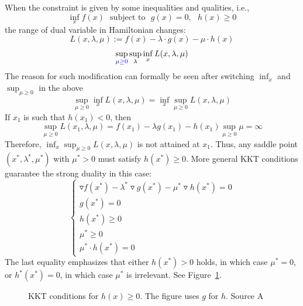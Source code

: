 \documentclass[11pt]{book}
\begin{document}
When the constraint is given by some inequalities and qualities, i.e.,
\begin{equation}
    \label{constraint_optimization2}
    \inf_x f(x) ~~~ \textrm{subject to}~~~g(x)=0,~~~h(x)\ge 0
\end{equation}
the range of dual variable in Hamiltonian changes:
\begin{equation}\label{lagrangian2}
    L(x,\lambda,\mu):= f(x) - \lambda \cdot g(x) - \mu \cdot h(x)
\end{equation}
\begin{equation}
    \sup_{{\color{blue}\mu\ge0}}\sup_{\lambda}\inf_{x}L(x,\lambda,\mu)
\end{equation}
The reason for such modification can formally be seen after switching $\inf_x$ and $\sup_{\mu\ge0}$ in the above
\begin{equation}
    \sup_{\mu\ge0}\inf_{x}L(x,\lambda,\mu) =\inf_{x}\sup_{\mu\ge0}L(x,\lambda,\mu)
\end{equation}
If $x_1$ is such that $h(x_1)<0$, then 
$$\sup_{\mu\ge0}L(x_1,\lambda,\mu)= f(x_1) - \lambda g(x_1) - h(x_1) \sup_{\mu\ge0} \mu =\infty$$
Therefore, $\inf_{x}\sup_{\mu\ge0}L(x,\lambda,\mu)$ is not attained at $x_1$. Thus, any saddle point $(x^*,\lambda^*,\mu^*)$ with $\mu^*>0$ must satisfy $h(x^*)\ge0$. More general KKT conditions guarantee the strong duality in this case:
    \begin{equation} \label{cond:KKT_general}
    \begin{cases} \triangledown f (x^*) - \lambda^* \triangledown g (x^*) -\mu^* \triangledown 
 h(x^*)= 0\\
            g(x^*)=0\\
            h(x^*)\ge0\\
            \mu^*\ge0\\
            \mu^*\cdot h(x^*)=0
        \end{cases}
    \end{equation}
The last equality emphasizes that either $h(x^*)>0$ holds, in which case $\mu^*=0$, or $h^*(x^*)=0$, in which case $\mu^*$ is irrelevant. See Figure~\ref{fig:KKT_2}.
\begin{figure}
    \centering

    \caption{KKT conditions for $h(x)\ge0$. The figure uses $g$ for $h$. Source A}
    \label{fig:KKT_2}
\end{figure}
\end{document}
